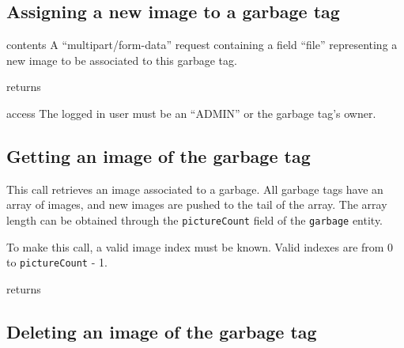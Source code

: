 \subsection{Assigning a new image to a garbage tag}

\begin{apidata}{contents}
  A ``multipart/form-data'' request containing a field ``file'' representing a
  new image to be associated to this garbage tag.
\end{apidata}
\begin{apidata}{returns}
  \begin{datalist}
  \end{datalist}
\end{apidata}
\begin{apidata}{access}
The logged in user must be an ``ADMIN'' or the garbage tag's owner.
\end{apidata}


\subsection{Getting an image of the garbage tag}

This call retrieves an image associated to a garbage. All garbage tags have an
array of images, and new images are pushed to the tail of the array. The array
length can be obtained through the \texttt{pictureCount} field of the
\texttt{garbage} entity. 

To make this call, a valid image index must be known. Valid indexes are from 0
to \texttt{pictureCount} - 1.

\begin{apidata}{returns}
  \begin{datalist}
  \end{datalist}
\end{apidata}


\subsection{Deleting an image of the garbage tag}

